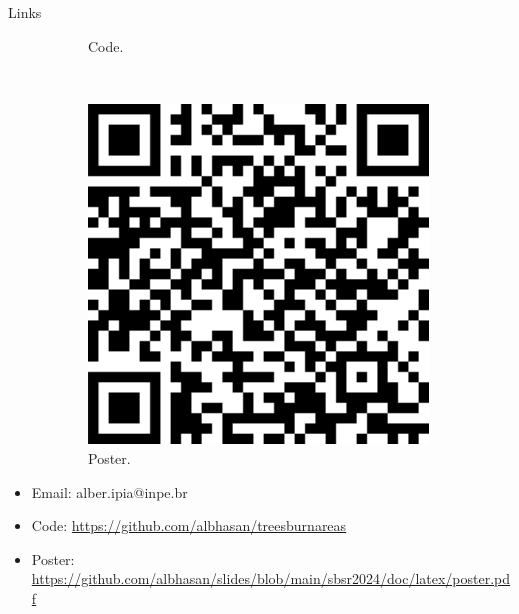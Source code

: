 \documentclass[20pt]{beamer}
\begin{document}
\begin{frame}[fragile,t]
\begin{columns}[t]
\begin{column}{0.33\linewidth}
\begin{block}{Links}
\begin{figure}
\begin{subfigure}[b]{0.2\textwidth}
\centering
{Code.}
    \end{subfigure}
    ~
    \begin{subfigure}[b]{0.2\textwidth}
\includegraphics[width=0.99\textwidth]{images/qr_poster.png} \\
\centering
{Poster.}
    \end{subfigure}
\end{figure}
\vspace{0.7cm}
    \begin{itemize}
        \item Email: alber.ipia@inpe.br
        \item Code: {\small\url{https://github.com/albhasan/treesburnareas}}
        \item Poster: {\small\url{https://github.com/albhasan/slides/blob/main/sbsr2024/doc/latex/poster.pdf}}
    \end{itemize}
\vspace{0.3cm}
    \end{block}
\end{column}


\end{columns}
\end{frame}
\end{document}
